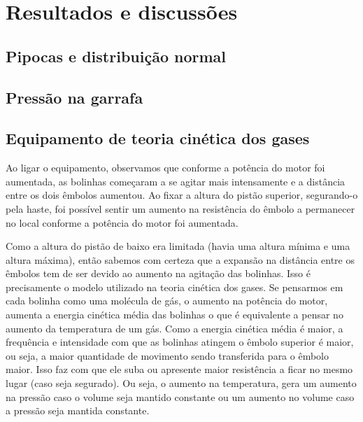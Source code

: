 \section{Resultados e discussões}

\subsection{Pipocas e distribuição normal}

\subsection{Pressão na garrafa}

\subsection{Equipamento de teoria cinética dos gases}

Ao ligar o equipamento, observamos que conforme a potência do motor foi aumentada, as bolinhas começaram a se agitar mais intensamente e a distância entre os dois êmbolos aumentou. Ao fixar a altura do pistão superior, segurando-o pela haste, foi possível sentir um aumento na resistência do êmbolo a permanecer no local conforme a potência do motor foi aumentada. 

Como a altura do pistão de baixo era limitada (havia uma altura mínima e uma altura máxima), então sabemos com certeza que a expansão na distância entre os êmbolos tem de ser devido ao aumento na agitação das bolinhas. Isso é precisamente o modelo utilizado na teoria cinética dos gases. Se pensarmos em cada bolinha como uma molécula de gás, o aumento na potência do motor, aumenta a energia cinética média das bolinhas o que é equivalente a pensar no aumento da temperatura de um gás. Como a energia cinética média é maior, a frequência e intensidade com que as bolinhas atingem o êmbolo superior é maior, ou seja, a maior quantidade de movimento sendo transferida para o êmbolo maior. Isso faz com que ele suba ou apresente maior resistência a ficar no mesmo lugar (caso seja segurado). Ou seja, o aumento na temperatura, gera um aumento na pressão caso o volume seja mantido constante ou um aumento no volume caso a pressão seja mantida constante. 
